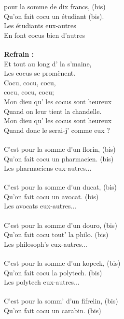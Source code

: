 
 pour la somme de dix francs, (bis)
\\Qu'on fait cocu un étudiant (bis).
\\Les étudiants eux-autres
\\En font cocus bien d'autres
\\\\\textbf{Refrain :}
\\Et tout au long d' la s'maine,
\\Les cocus se promènent.
\\Cocu, cocu, cocu,
\\cocu, cocu, cocu;
\\Mon dieu qu' les cocus sont heureux
\\Quand on leur tient la chandelle.
\\Mon dieu qu' les cocus sont heureux
\\Quand donc le serai-j' comme eux ?
\\\\C'est pour la somme d'un florin, (bis)
\\Qu'on fait cocu un pharmacien. (bis)
\\Les pharmaciens eux-autres...
\\\\C'est pour la somme d'un ducat, (bis)
\\Qu'on fait cocu un avocat. (bis)
\\Les avocats eux-autres...
\\\\C'est pour la somme d'un douro, (bis)
\\Qu'on fait cocu tout' la philo. (bis)
\\Les philosoph's eux-autres...
\\\\C'est pour la somme d'un kopeck, (bis)
\\Qu'on fait cocu la polytech. (bis)
\\Les polytech eux-autres...
\\\\C'est pour la somm' d'un fifrelin, (bis)
\\Qu'on fait cocu un carabin. (bis)
